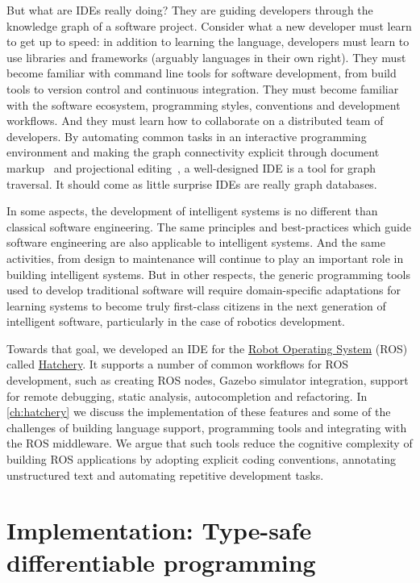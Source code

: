 But what are IDEs really doing? They are guiding developers through the knowledge graph of a software project. Consider what a new developer must learn to get up to speed: in addition to learning the language, developers must learn to use libraries and frameworks (arguably languages in their own right). They must become familiar with command line tools for software development, from build tools to version control and continuous integration. They must become familiar with the software ecosystem, programming styles, conventions and development workflows. And they must learn how to collaborate on a distributed team of developers. By automating common tasks in an interactive programming environment and making the graph connectivity explicit through document markup~\citep{goldfarb1981generalized} and projectional editing~\citep{voelter2014towards}, a well-designed IDE is a tool for graph traversal. It should come as little surprise IDEs are really graph databases.

In some aspects, the development of intelligent systems is no different than classical software engineering. The same principles and best-practices which guide software engineering are also applicable to intelligent systems. And the same activities, from design to maintenance will continue to play an important role in building intelligent systems. But in other respects, the generic programming tools used to develop traditional software will require domain-specific adaptations for learning systems to become truly first-class citizens in the next generation of intelligent software, particularly in the case of robotics development.

Towards that goal, we developed an IDE for the \href{https://www.ros.org/}{Robot Operating System} (ROS) called \href{https://github.com/duckietown/hatchery}{Hatchery}. It supports a number of common workflows for ROS development, such as creating ROS nodes, Gazebo simulator integration, support for remote debugging, static analysis, autocompletion and refactoring. In \autoref{ch:hatchery} we discuss the implementation of these features and some of the challenges of building language support, programming tools and integrating with the ROS middleware. We argue that such tools reduce the cognitive complexity of building ROS applications by adopting explicit coding conventions, annotating unstructured text and automating repetitive development tasks.

\section{Implementation: Type-safe differentiable programming}

